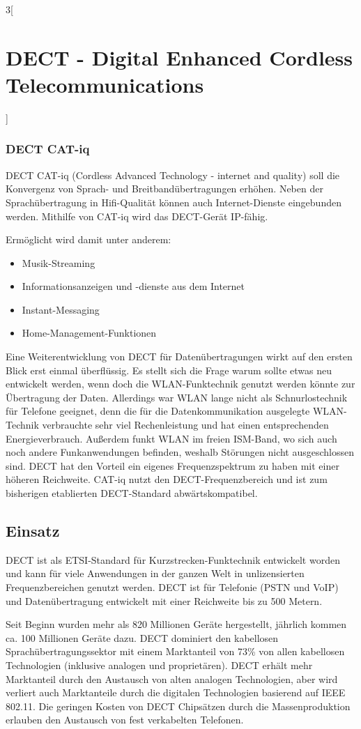 \begin{multicols}{3}[\section{DECT - Digital Enhanced Cordless Telecommunications}]
\subsubsection*{DECT CAT-iq}
DECT CAT-iq (Cordless Advanced Technology - internet and quality) soll die Konvergenz von Sprach- und Breitbandübertragungen erhöhen. Neben der Sprachübertragung in Hifi-Qualität können auch Internet-Dienste eingebunden werden. Mithilfe von CAT-iq wird das DECT-Gerät IP-fähig.

Ermöglicht wird damit unter anderem:
\begin{itemize}
\item Musik-Streaming
\item Informationsanzeigen und -dienste aus dem Internet
\item Instant-Messaging 
\item Home-Management-Funktionen
\end{itemize}

Eine Weiterentwicklung von DECT für Datenübertragungen wirkt auf den ersten Blick erst einmal überflüssig. Es stellt sich die Frage warum sollte  etwas neu entwickelt werden, wenn doch die WLAN-Funktechnik genutzt werden könnte zur Übertragung der Daten. Allerdings war WLAN lange nicht als Schnurlostechnik für Telefone geeignet, denn die für die Datenkommunikation ausgelegte WLAN-Technik verbrauchte sehr viel Rechenleistung und hat einen entsprechenden Energieverbrauch. Außerdem funkt WLAN im freien ISM-Band, wo sich auch noch andere Funkanwendungen befinden, weshalb Störungen nicht ausgeschlossen sind. DECT hat den Vorteil ein eigenes Frequenzspektrum zu haben mit einer höheren Reichweite. CAT-iq nutzt den DECT-Frequenzbereich und ist zum bisherigen etablierten DECT-Standard abwärtskompatibel. \cite{dect.3}
\subsection*{Einsatz}
DECT ist als ETSI-Standard für  Kurzstrecken-Funktechnik entwickelt worden und kann für viele Anwendungen in der ganzen Welt in unlizensierten Frequenzbereichen genutzt werden. DECT ist für Telefonie (PSTN und VoIP) und Datenübertragung entwickelt mit einer Reichweite bis zu 500 Metern.

Seit Beginn wurden mehr als 820 Millionen Geräte hergestellt, jährlich kommen ca. 100 Millionen Geräte dazu. DECT dominiert den kabellosen Sprachübertragungssektor mit einem Marktanteil von 73\% von allen kabellosen Technologien (inklusive analogen und proprietären). DECT erhält mehr Marktanteil durch den Austausch von alten analogen Technologien, aber wird verliert auch Marktanteile durch die digitalen Technologien basierend auf IEEE 802.11. Die geringen Kosten von DECT Chipsätzen durch die Massenproduktion erlauben den Austausch von fest verkabelten Telefonen.


\end{multicols}
